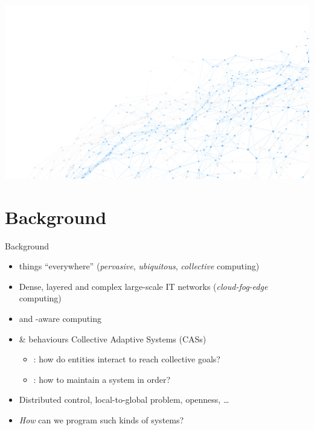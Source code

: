 \documentclass[9pt, aspectratio=169, handout]{beamer}
\begin{document}
\begin{frame}[plain]
  \begin{backgroundblock} 
    \includegraphics[width=\paperwidth]{img/network.jpg} 
  \end{backgroundblock} 
\titlepage
\end{frame}
\addtocounter{framenumber}{-1}
\section{Background}
\begin{frame}{Background}
  \begin{card}
    \begin{itemize}
      \item {} things ``everywhere'' (\emph{pervasive}, \emph{ubiquitous}, \emph{collective} computing)
      \item Dense, layered and complex large-scale IT networks (\emph{cloud-fog-edge} computing)
      \item {} and -aware computing
    \end{itemize}
  \end{card}
  \begin{alarm}[Challenges]
    \begin{itemize}
      \item {} \&  behaviours \emph{\faArrowRight} Collective Adaptive Systems (CASs)
      \begin{itemize}
        \item {}: how do entities interact to reach collective goals?
        \item {}: how to maintain a system in order?
      \end{itemize}
      \item Distributed control, local-to-global problem, openness, \dots
      \item \emph{How} can we program such kinds of systems?
    \end{itemize}
  \end{alarm}
\end{frame}
\end{document}
